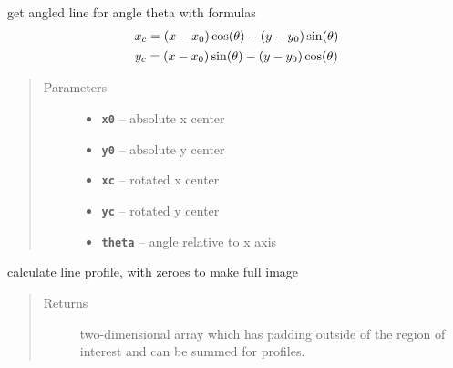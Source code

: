 \documentclass[letterpaper,10pt,english]{sphinxmanual}
\begin{document}
\begin{fulllineitems}
\begin{fulllineitems}
\label{fit_object:Fitobject.fit_object.get_angled_line}
get angled line for angle theta with formulas
\begin{gather}
\begin{split}x_c = (x-x_0) \cos(\theta) - (y-y_0) \sin(\theta)\end{split}\notag\\\begin{split}y_c = (x-x_0) \sin(\theta) - (y-y_0) \cos(\theta)\end{split}\notag
\end{gather}\begin{quote}\begin{description}
\item[{Parameters}] \leavevmode\begin{itemize}
\item {} 
\textbf{\texttt{x0}} -- absolute x center

\item {} 
\textbf{\texttt{y0}} -- absolute y center

\item {} 
\textbf{\texttt{xc}} -- rotated x center

\item {} 
\textbf{\texttt{yc}} -- rotated y center

\item {} 
\textbf{\texttt{theta}} -- angle relative to x axis

\end{itemize}

\end{description}\end{quote}

\end{fulllineitems}


\begin{fulllineitems}
\label{fit_object:Fitobject.fit_object.line_profile}
calculate line profile, with zeroes to make full image
\begin{quote}\begin{description}
\item[{Returns}] \leavevmode
two-dimensional array which has padding outside of the region of interest and can be summed for profiles.


\end{description}
\end{quote}
\end{fulllineitems}
\end{fulllineitems}
\end{document}
